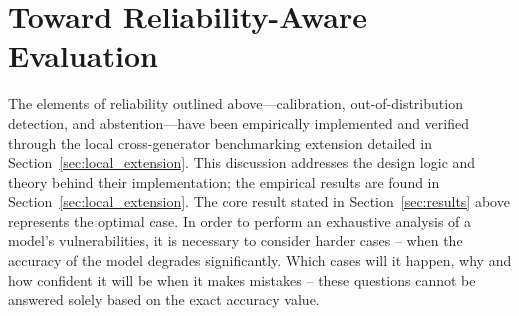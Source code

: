 \documentclass[pdflatex,sn-mathphys-num,iicol]{sn-jnl}
\begin{document}
\begin{table}[!htbp]
\centering
\caption{Sensitivity analysis of the V-Score rankings for the top five generator--difficulty
configurations, as specified by the default ranking. The columns present V-Score values under the five explicitly listed weight configurations (default $(0.4,0.2,0.2)$, accuracy-only $(1,0,0)$, calibration-heavy $(0,0.8,0.2)$, entropy-heavy $(0,0.2,0.8)$, and equal-weight $(1/3,1/3,1/3)$), calculated using the provided implementation.}
\label{tab:vscore_sensitivity}
\end{table}

\FloatBarrier
\section{Toward Reliability-Aware Evaluation}
\label{sec:architecture}

The elements of reliability outlined above---calibration, out-of-distribution
detection, and abstention---have been empirically implemented and verified
through the local cross-generator benchmarking extension detailed in
Section~\ref{sec:local_extension}. This discussion addresses the design logic and
theory behind their implementation; the empirical results are found in
Section~\ref{sec:local_extension}. The core result stated in Section~\ref{sec:results} above represents the optimal case. In order to perform an exhaustive analysis of a model's vulnerabilities, it is necessary to consider harder cases -- when the accuracy of the model degrades significantly. Which cases will it happen, why and how confident it will be when it makes mistakes -- these questions cannot be answered solely based on the exact accuracy value.
\end{document}
